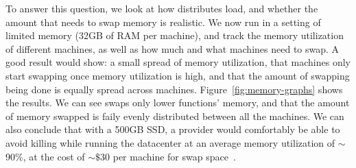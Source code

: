 To answer this question, we look at how \sys{} distributes load, and whether the
amount that \sys{} needs to swap memory is realistic. We now run \sys{} in a
setting of limited memory (32GB of RAM per machine), and track the memory
utilization of different machines, as well as how much and what machines need to
swap. A good result would show: a small spread of memory utilization, that
machines only start swapping once memory utilization is high, and that the
amount of swapping being done is equally spread across machines.
Figure~\ref{fig:memory-graphs} shows the results. We can see \sys{} swaps only
lower \class{} functions' memory, and that the amount of memory swapped is faily
evenly distributed between all the machines. We can also conclude that with a
500GB SSD, a provider would comfortably be able to avoid killing while running
the datacenter at an average memory utilization of $\sim$90$\%$, at the cost of
$\sim\$$30 per machine for swap space~\cite{ssd-price}.


